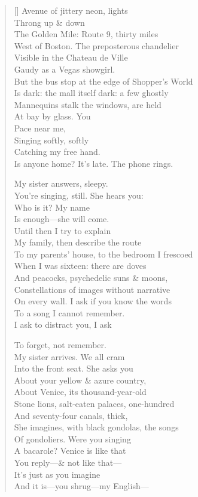 \label{ch:the_golden_mile}
\settowidth{\versewidth}{Off the Golden Mile: behind us, night closes over}
\begin{verse}[\versewidth]
Avenue of jittery neon, lights\\
Throng up \& down\\
The Golden Mile: Route 9, thirty miles\\
West of Boston. The preposterous chandelier\\
Visible in the Chateau de Ville\\
Gaudy as a Vegas showgirl.\\
But the bus stop at the edge of Shopper's World\\
Is dark: the mall itself dark: a few ghostly\\
Mannequins stalk the windows, are held\\
At bay by glass. You\\
Pace near me,\\
Singing softly, softly\\
Catching my free hand.\\
Is anyone home?  It's late.  The phone rings.

My sister answers, sleepy.\\
You're singing, still. She hears you:\\
Who is it?  My name\\
Is enough---she will come.\\
Until then I try to explain\\
My family, then describe the route\\
To my parents' house, to the bedroom I frescoed\\
When I was sixteen: there are doves\\
And peacocks, psychedelic suns \& moons,\\
Constellations of images without narrative\\
On every wall. I ask if you know the words\\
To a song I cannot remember.\\
I ask to distract you, I ask

To forget, not remember.\\
My sister arrives.  We all cram\\
Into the front seat. She asks you\\
About your yellow \& azure country,\\
About Venice, its thousand-year-old\\
Stone lions, salt-eaten palaces, one-hundred\\
And seventy-four canals, thick,\\
She imagines, with black gondolas, the songs\\
Of gondoliers. Were you singing\\
A bacarole? Venice is like that\\
You reply---\& not like that---\\
It's just as you imagine\\
And it is---you shrug---my English---


\end{verse}
